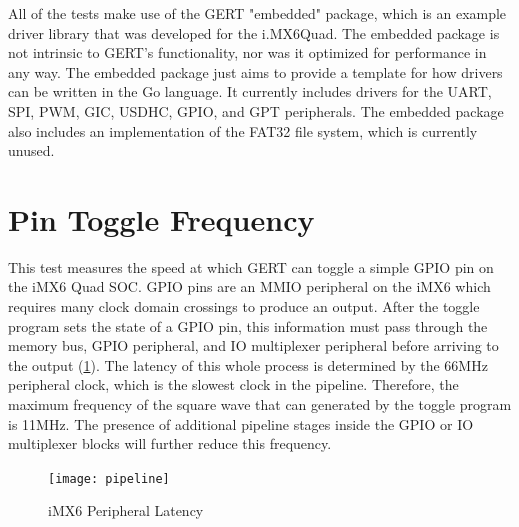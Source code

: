 All of the tests make use of the GERT "embedded" package, which is an example
driver library that was developed for the i.MX6Quad. The embedded package is not intrinsic to GERT's
functionality, nor was it optimized for performance in any way. The embedded package
just aims to provide a template for how drivers can be written in the Go language.
It currently includes drivers for the UART, SPI, PWM, GIC, USDHC, GPIO, and GPT peripherals.
The embedded package also includes an implementation of the FAT32 file system, which is 
currently unused.


\section{Pin Toggle Frequency}\label{sec:pin_toggle}
This test measures the speed at which GERT can toggle a simple GPIO pin on
the iMX6 Quad SOC. GPIO pins are an MMIO peripheral on the iMX6 which requires
many clock domain crossings to produce an output. After the toggle program sets
the state of a GPIO pin, this information must pass through the memory bus,
GPIO peripheral, and IO multiplexer peripheral before arriving to the output (\ref{fig:pipeline}).
The latency of this whole process is determined by the 66MHz peripheral clock,
which is the slowest clock in the pipeline. Therefore, the maximum frequency
of the square wave that can generated by the toggle program is 11MHz. The presence
of additional pipeline stages inside the GPIO or IO multiplexer blocks will further
reduce this frequency.

\begin{figure}[h]
\begin{center}
  \texttt{[image: pipeline]}
\end{center}
  \caption{iMX6 Peripheral Latency} \label{fig:pipeline}
\end{figure}

